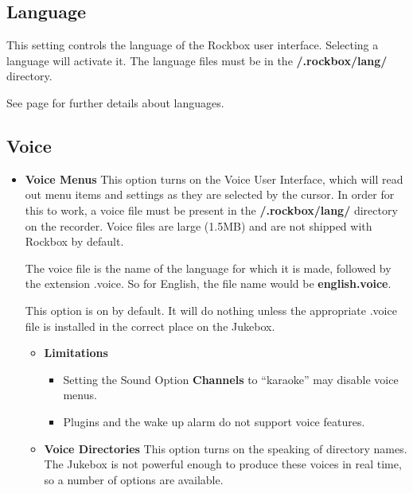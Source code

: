 \subsection{\label{ref:Language}Language}
This setting controls the language of the Rockbox user interface.
Selecting  a language will activate it. The language files must be in
the \textbf{/.rockbox/lang/} directory. 

See page \pageref{ref:Loadinglanguages} for further details about
languages.

\subsection{Voice}

\begin{itemize}
\item \textbf{Voice Menus}
This option turns on the Voice User Interface, which will read out menu items and settings as they are selected by the cursor.  In order for this to work, a voice file must be present in the \textbf{/.rockbox/lang/} directory on the recorder.  Voice files are large (1.5MB) and are not shipped with Rockbox by
default.

The voice file is the name of the language for which it is made,
followed by the extension .voice.  So for English, the file name would
be \textbf{english.voice}. 

This option is on by default.  It will do nothing unless the appropriate
.voice file is installed in the correct place on the Jukebox.

\begin{itemize}
\item \textbf{Limitations}
\begin{itemize}
\item Setting the Sound Option \textbf{Channels} to ``karaoke'' may
disable voice menus.  
\item Plugins and the wake up alarm do not support voice features.
\end{itemize}

\item \textbf{Voice Directories}
This option turns on the speaking of directory names.  The Jukebox is
not powerful enough to produce these voices in real time, so a number of options are available.


\end{itemize}
\end{itemize}
